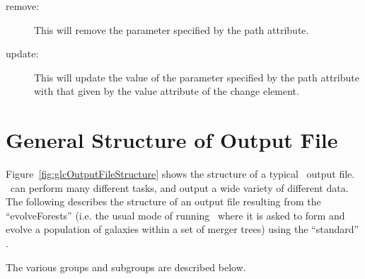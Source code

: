 \begin{description}
\item[{\normalfont \ttfamily remove}:] This will remove the parameter specified by the {\normalfont \ttfamily path} attribute.
\item[{\normalfont \ttfamily update}:] This will update the value of the parameter specified by the {\normalfont \ttfamily path} attribute with that given by the {\normalfont \ttfamily value} attribute of the change element.
\end{description}

\section{General Structure of Output File}\label{sec:outputFile}

Figure~\ref{fig:glcOutputFileStructure} shows the structure of a typical \glc\ output file. \glc\ can perform many different tasks, and output a wide variety of different data. The following describes the structure of an output file resulting from the ``{\normalfont \ttfamily evolveForests}''  (i.e. the usual mode of running \glc\ where it is asked to form and evolve a population of galaxies within a set of merger trees) using the ``{\normalfont \ttfamily standard}'' .

The various groups and subgroups are described below.

